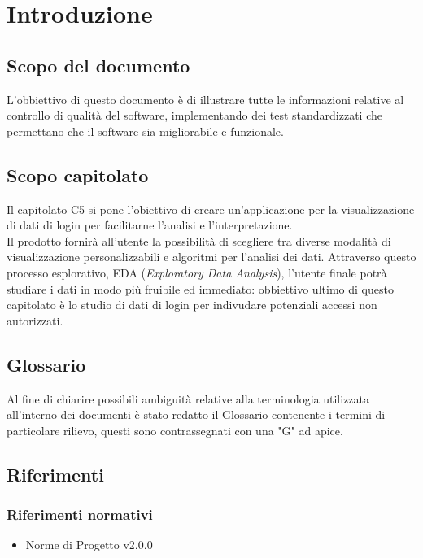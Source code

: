 \section{Introduzione}

\subsection{Scopo del documento}

L'obbiettivo di questo documento è di illustrare tutte le informazioni relative al controllo di qualità del software, implementando dei test standardizzati che permettano che il software sia migliorabile e funzionale.

\subsection{Scopo capitolato}
Il capitolato C5 si pone l'obiettivo di creare un'applicazione per la visualizzazione di dati
di login per facilitarne l'analisi e l'interpretazione.\\
Il prodotto fornirà all'utente la possibilità di scegliere tra diverse modalità di visualizzazione personalizzabili 
e algoritmi per l'analisi dei dati. Attraverso questo processo esplorativo, EDA (\textit{Exploratory Data Analysis}), 
l'utente finale potrà studiare i dati in modo più fruibile ed immediato: obbiettivo ultimo di questo capitolato 
è lo studio di dati di login per indivudare potenziali accessi non autorizzati.

\subsection{Glossario}
Al fine di chiarire possibili ambiguità relative alla terminologia utilizzata all'interno dei
documenti è stato redatto il Glossario contenente i termini di particolare rilievo, questi
sono contrassegnati con una "G" ad apice.

\subsection{Riferimenti}
\subsubsection{Riferimenti normativi}
\begin{itemize}
    \item Norme di Progetto v2.0.0
\end{itemize}


